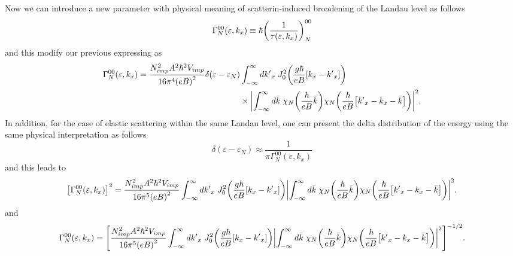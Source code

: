 \noindent
Now we can introduce a new parameter with physical meaning of scatterin-induced broadening of the Landau level as follows
\begin{equation} \label{5.3}
  \Gamma^{00}_{N}(\varepsilon,k_x) \equiv \hbar \qty(\frac{1}{\tau(\varepsilon,k_x)})^{00}_{N}
\end{equation}
and this modify our previous expressing as
\begin{equation} \label{5.4}
  \begin{aligned}
    \Gamma^{00}_{N}(\varepsilon,k_x)  =
    \frac { N_{imp}^2 A^2 \hbar^2 V_{imp}}{16\pi^4 \qty(eB)^2}
    \delta(\varepsilon - \varepsilon_{N}) &
    \int_{-\infty}^{\infty} d {k'}_x \;
    J_0^2\qty(\frac{g\hbar}{eB}[{k}_x - {k'}_x])
    \\
    & \times
    \qty|
    \int_{-\infty}^{\infty} d\bar{k} \;
    {\chi}_{N}\qty(\frac{\hbar}{eB}\bar{k})
    {\chi}_{N}\qty(\frac{\hbar}{eB} \qty[{k'}_x - {k}_x - \bar{k}])|^2.
  \end{aligned}
\end{equation}
In addition, for the case of elastic scattering within the same Landau level, one can present the delta distribution of the energy using the same physical interpretation as follows
\begin{equation} \label{5.5}
  \delta(\varepsilon - \varepsilon_{N}) \approx
  \frac{1}{\pi \Gamma^{00}_{N}(\varepsilon,k_x)}
\end{equation}
and this leads to
\begin{equation} \label{5.6}
  \begin{aligned}
    \qty[\Gamma^{00}_{N}(\varepsilon,k_x)]^2  =
    \frac { N_{imp}^2 A^2 \hbar^2 V_{imp}}{16\pi^5 \qty(eB)^2}
    \int_{-\infty}^{\infty} d {k'}_x \;
    J_0^2\qty(\frac{g\hbar}{eB}[{k}_x - {k'}_x])
    \qty|
    \int_{-\infty}^{\infty} d\bar{k} \;
    {\chi}_{N}\qty(\frac{\hbar}{eB}\bar{k})
    {\chi}_{N}\qty(\frac{\hbar}{eB} \qty[{k'}_x - {k}_x - \bar{k}])|^2.
  \end{aligned}
\end{equation}
and
\begin{equation} \label{5.7}
  \begin{aligned}
    \Gamma^{00}_{N}(\varepsilon,k_x)  =
    \qty[
    \frac { N_{imp}^2 A^2 \hbar^2 V_{imp}}{16\pi^5 \qty(eB)^2}
    \int_{-\infty}^{\infty} d {k'}_x \;
    J_0^2\qty(\frac{g\hbar}{eB}[{k}_x - {k'}_x])
    \qty|
    \int_{-\infty}^{\infty} d\bar{k} \;
    {\chi}_{N}\qty(\frac{\hbar}{eB}\bar{k})
    {\chi}_{N}\qty(\frac{\hbar}{eB} \qty[{k'}_x - {k}_x - \bar{k}])|^2
    ]^{-1/2}.
  \end{aligned}
\end{equation}

